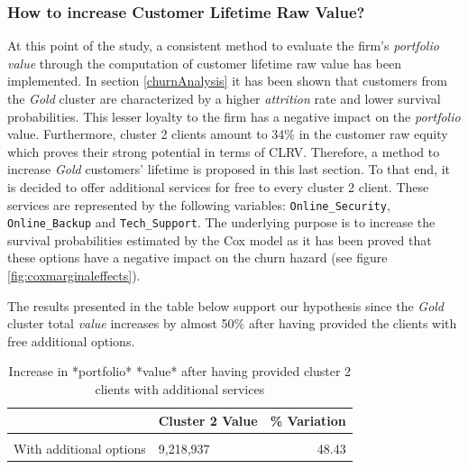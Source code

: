 \documentclass[
]{book}
\begin{document}
\hypertarget{how-to-increase-customer-lifetime-raw-value}{%
\subsubsection*{How to increase Customer Lifetime Raw Value?}\label{how-to-increase-customer-lifetime-raw-value}}

At this point of the study, a consistent method to evaluate the firm's \emph{portfolio} \emph{value} through the computation of customer lifetime raw value has been implemented. In section \ref{churnAnalysis} it has been shown that customers from the \emph{Gold} cluster are characterized by a higher \emph{attrition} rate and lower survival probabilities. This lesser loyalty to the firm has a negative impact on the \emph{portfolio} value. Furthermore, cluster 2 clients amount to 34\% in the customer raw equity which proves their strong potential in terms of CLRV. Therefore, a method to increase \emph{Gold} customers' lifetime is proposed in this last section. To that end, it is decided to offer additional services for free to every cluster 2 client. These services are represented by the following variables: \texttt{Online\_Security}, \texttt{Online\_Backup} and \texttt{Tech\_Support}. The underlying purpose is to increase the survival probabilities estimated by the Cox model as it has been proved that these options have a negative impact on the churn hazard (see figure \ref{fig:coxmarginaleffects}).

The results presented in the table below support our hypothesis since the \emph{Gold} cluster total \emph{value} increases by almost 50\% after having provided the clients with free additional options.

\begin{table}[H]

\caption{\label{tab:unnamed-chunk-32}Increase in *portfolio* *value* after having provided cluster 2 clients with additional services}
\centering
\begin{tabular}[t]{llr}
\toprule
  & Cluster 2 Value & \% Variation\\
\midrule
\cellcolor{gray!6}{Reference} & \cellcolor{gray!6}{6,211,027} & \cellcolor{gray!6}{0.00}\\
With additional options & 9,218,937 & 48.43\\
\bottomrule
\end{tabular}
\end{table}
\end{document}

